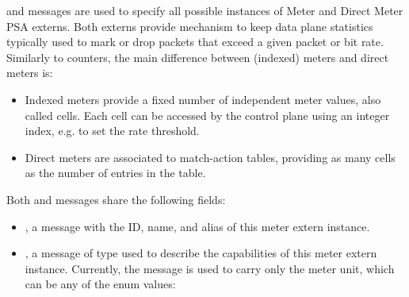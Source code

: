 \documentclass[11pt]{article}
\begin{document}
{%
\noindent{} and  messages are used to specify all possible instances of
Meter and Direct Meter PSA externs. Both externs provide mechanism to keep data
plane statistics typically used to mark or drop packets that exceed a given
packet or bit rate. Similarly to counters, the main difference between (indexed)
meters and direct meters is:%

\begin{itemize}%

\item{}
Indexed meters provide a fixed number of independent meter values, also called
cells. Each cell can be accessed by the control plane using an integer index,
e.g. to set the rate threshold.%

\item{}
Direct meters are associated to match-action tables, providing as many cells
as the number of entries in the table.%
\end{itemize}%

\noindent{}Both  and  messages share the following fields:%

\begin{itemize}%

\item{}
, a  message with the ID, name, and alias of this meter
extern instance.%

\item{}
, a message of type  used to describe the capabilities of
this meter extern instance. Currently, the  message is used to
carry only the meter unit, which can be any of the  enum
values:%


\end{itemize}}
\end{document}
